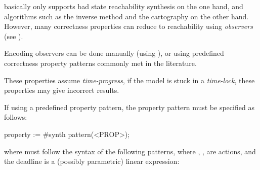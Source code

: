 \imitator{} basically only supports bad state reachability synthesis on the one hand, and algorithms such as the inverse method and the cartography on the other hand.
However, many correctness properties can reduce to reachability using \emph{observers} (see \cite{ABL98,ABBL98,ABBL03,Andre13ICECCS}).

Encoding observers can be done manually (using \adhoc{} \IPTA{}), or using predefined correctness property patterns commonly met in the literature.

\begin{becareful}
	These properties assume \emph{time-progress}, \ie{} if the model is stuck in a \emph{time-lock}, these properties may give incorrect results.
\end{becareful}

% 
% 
% 
% 
% 



If using a predefined property pattern, the property pattern must be specified as follows:

\begin{IMITATORproperty}
property := #synth pattern(<PROP>);
\end{IMITATORproperty}

\noindent{}where  must follow the syntax of the following patterns, where , ,  are actions, and the deadline  is a (possibly parametric) linear expression:

